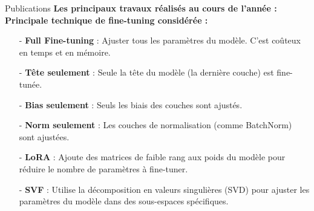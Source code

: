 \begin{subsectionframemod}{Publications}
    \textbf{Les principaux travaux réalisés au cours de l'année :}
    \textbf{Principale technique de fine-tuning considérée :}
    \begin{itemize}
        \item[-] \textbf{Full Fine-tuning} : Ajuster tous les paramètres du modèle. C'est coûteux en temps et en mémoire.
        \item[-] \textbf{Tête seulement} : Seule la tête du modèle (la dernière couche) est fine-tunée.
        \item[-] \textbf{Bias seulement} : Seuls les biais des couches sont ajustés.
        \item[-] \textbf{Norm seulement} : Les couches de normalisation (comme BatchNorm) sont ajustées.
        \item[-] \textbf{LoRA} : Ajoute des matrices de faible rang aux poids du modèle pour réduire le nombre de paramètres à fine-tuner.
        \item[-] \textbf{SVF} : Utilise la décomposition en valeurs singulières (SVD) pour ajuster les paramètres du modèle dans des sous-espaces spécifiques.
    \end{itemize}

\end{subsectionframemod}

